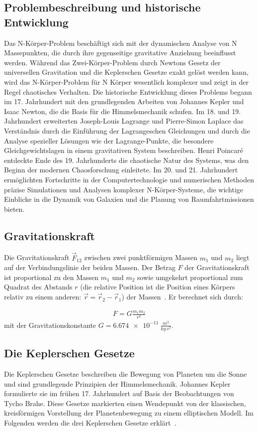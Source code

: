 \documentclass[a4paper,12pt,twoside]{article}
\begin{document}
\subsection{Problembeschreibung und historische Entwicklung}
Das N-Körper-Problem beschäftigt sich mit der dynamischen Analyse von N Massepunkten, 
die durch ihre gegenseitige gravitative Anziehung beeinflusst werden. 
Während das Zwei-Körper-Problem durch Newtons Gesetz der universellen Gravitation 
und die Keplerschen Gesetze exakt gelöst werden kann, wird das N-Körper-Problem 
für N Körper wesentlich komplexer und zeigt in der Regel chaotisches Verhalten. 
Die historische Entwicklung dieses Problems begann im 17. Jahrhundert mit den 
grundlegenden Arbeiten von Johannes Kepler und Isaac Newton, die die Basis für 
die Himmelsmechanik schufen. Im 18. und 19. Jahrhundert erweiterten Joseph-Louis 
Lagrange und Pierre-Simon Laplace das Verständnis durch die Einführung der 
Lagrangeschen Gleichungen und durch die Analyse spezieller Lösungen wie der 
Lagrange-Punkte, die besondere Gleichgewichtslagen in einem gravitativen System 
beschreiben. Henri Poincaré entdeckte Ende des 19. Jahrhunderts die chaotische 
Natur des Systems, was den Beginn der modernen Chaosforschung einleitete. 
Im 20. und 21. Jahrhundert ermöglichten Fortschritte in der Computertechnologie 
und numerischen Methoden präzise Simulationen und Analysen komplexer N-Körper-Systeme, 
die wichtige Einblicke in die Dynamik von Galaxien und die Planung von Raumfahrtmissionen 
bieten.

\subsection{Gravitationskraft}
Die Gravitationskraft $\vec{F}_{12}$ zwischen zwei punktförmigen Massen $m_1$ und $m_2$ liegt 
auf der Verbindungslinie der beiden Massen.
Der Betrag $F$ der Gravitationskraft ist proportional zu den Massen $m_1$ und $m_2$ sowie 
umgekehrt proportional zum Quadrat des Abstands $r$ 
(die relative Position ist die Position eines Körpers relativ zu 
einem anderen: \(\vec{r} = \vec{r}_2 - \vec{r}_1\)) der 
Massen~\cite{LeifiPhysikGravitation}. Er berechnet sich durch:

\begin{align*}
	F = G \frac{m_1 m_2}{r^2}
\end{align*}
mit der Gravitationskonstante $G = \SI{6.674e-11}{\frac{m^3}{kg\,s^2}}$.

\subsection{Die Keplerschen Gesetze}
Die Keplerschen Gesetze beschreiben die Bewegung von Planeten um die Sonne 
und sind grundlegende Prinzipien der Himmelsmechanik. Johannes Kepler formulierte 
sie im frühen 17. Jahrhundert auf Basis der Beobachtungen von Tycho Brahe. 
Diese Gesetze markierten einen Wendepunkt von der klassischen, kreisförmigen 
Vorstellung der Planetenbewegung zu einem elliptischen Modell. 
Im Folgenden werden die drei Keplerschen Gesetze erklärt~\cite{LeifiPhysikKepler}.
\end{document}
